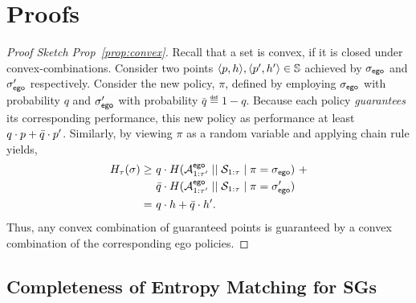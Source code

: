 \section{Proofs}\label{sec:proofs}
\begin{proof}[Proof Sketch Prop~\ref{prop:convex}]
  Recall that a set is convex, if it is closed under
  convex-combinations\footnotemark. Consider two points
  $\langle p, h \rangle, \langle p', h' \rangle \in
  \mathbb{S}$ achieved by ${\sigma_{\mathsf{ego}}}$ and ${\sigma'_{\mathsf{ego}}}$
  respectively. Consider the new policy, $\pi$, defined by employing
  ${\sigma_{\mathsf{ego}}}$ with probability $q$ and ${\sigma'_{\mathsf{ego}}}$ with
  probability $\bar{q} \eqdef 1 - q$.  Because each policy
  \emph{guarantees} its corresponding performance, this new policy as
  performance at least $q\cdot p + \bar{q}\cdot p'$.  Similarly,
  by viewing $\pi$ as a random variable and applying chain rule
  yields,
  \begin{equation}
    \begin{split}
      H_\tau(\sigma)
      \geq &~q \cdot H( {\mathcal{A}}^{\mathsf{ego}}_{1:\tau'} \mid\mid {\mathcal{S}}_{1:\tau} \mid \pi={\sigma_{\mathsf{ego}}})~+\\
      &~\bar{q}  \cdot H( {\mathcal{A}}^{\mathsf{ego}}_{1:\tau'} \mid\mid {\mathcal{S}}_{1:\tau} \mid \pi={\sigma'_{\mathsf{ego}}})\\
      =&~q\cdot h + \bar{q}\cdot h'.
    \end{split}
  \end{equation}
  Thus, any convex combination of guaranteed points is guaranteed by
  a convex combination of the corresponding ego policies.
\end{proof}


\subsection{Completeness of Entropy Matching for SGs}


